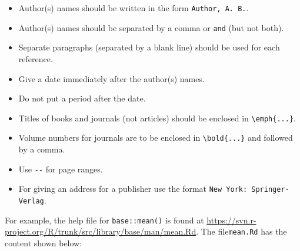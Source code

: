 \documentclass[
]{book}
\providecommand{\tightlist}{%
  \setlength{\itemsep}{0pt}\setlength{\parskip}{0pt}}
\begin{document}
\begin{enumerate}
  \begin{itemize}
  \tightlist
  \item
    Author(s) names should be written in the form \texttt{Author,\ A.\ B.}.
  \item
    Author(s) names should be separated by a comma or \texttt{and} (but not both).
  \item
    Separate paragraphs (separated by a blank line) should be used for each reference.
  \item
    Give a date immediately after the author(s) names.
  \item
    Do not put a period after the date.
  \item
    Titles of books and journals (not articles) should be enclosed in \texttt{\textbackslash{}emph\{...\}}.
  \item
    Volume numbers for journals are to be enclosed in \texttt{\textbackslash{}bold\{...\}} and followed by a comma.
  \item
    Use \texttt{-\/-} for page ranges.
  \item
    For giving an address for a publisher use the format \texttt{New\ York:\ Springer-Verlag}.
  \end{itemize}
\end{enumerate}

For example, the help file for \texttt{base::mean()} is found at \url{https://svn.r-project.org/R/trunk/src/library/base/man/mean.Rd}. The file\texttt{mean.Rd} has the content shown below:
\end{document}
